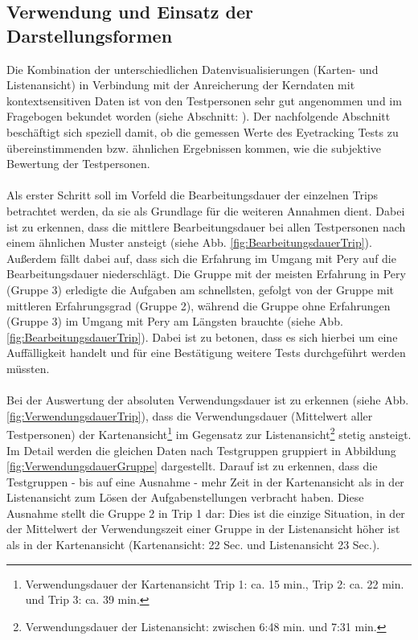 \documentclass[Bachelorarbeit.tex]{subfiles}
\begin{document}
\subsection{Verwendung und Einsatz der Darstellungsformen}
Die Kombination der unterschiedlichen Datenvisualisierungen (Karten- und Listenansicht) in Verbindung mit der Anreicherung der Kerndaten mit kontextsensitiven Daten ist von den Testpersonen sehr gut angenommen und im Fragebogen bekundet worden (siehe Abschnitt: ).
Der nachfolgende Abschnitt beschäftigt sich speziell damit, ob die gemessen Werte des Eyetracking Tests zu übereinstimmenden bzw. ähnlichen Ergebnissen kommen,  wie die subjektive Bewertung der Testpersonen.\\
\\
Als erster Schritt soll im Vorfeld die Bearbeitungsdauer der einzelnen Trips betrachtet werden, da sie als Grundlage für die weiteren Annahmen dient. 
Dabei ist zu erkennen, dass die mittlere Bearbeitungsdauer bei allen Testpersonen nach einem ähnlichen Muster ansteigt (siehe Abb. \ref{fig:BearbeitungsdauerTrip}).
Außerdem fällt dabei auf, dass sich die Erfahrung im Umgang mit Pery auf die Bearbeitungsdauer niederschlägt. 
Die Gruppe mit der meisten Erfahrung in Pery (Gruppe 3) erledigte die Aufgaben am schnellsten, gefolgt von der Gruppe mit mittleren Erfahrungsgrad (Gruppe 2), während die Gruppe ohne Erfahrungen (Gruppe 3) im Umgang mit Pery am Längsten brauchte (siehe Abb. \ref{fig:BearbeitungsdauerTrip}).
Dabei ist zu betonen, dass es sich hierbei um eine Auffälligkeit handelt und für eine Bestätigung weitere Tests durchgeführt werden müssten.\\
\\
Bei der Auswertung der absoluten Verwendungsdauer ist zu erkennen (siehe Abb. \ref{fig:VerwendungsdauerTrip}), dass die Verwendungsdauer (Mittelwert aller Testpersonen) der Kartenansicht\footnote{Verwendungsdauer der Kartenansicht Trip 1: ca. 15 min., Trip 2: ca. 22 min. und Trip 3: ca. 39 min.} im Gegensatz zur Listenansicht\footnote{Verwendungsdauer der Listenansicht: zwischen 6:48 min. und 7:31 min.} stetig ansteigt.  
Im Detail werden die gleichen Daten nach Testgruppen gruppiert in Abbildung \ref{fig:VerwendungsdauerGruppe} dargestellt. 
Darauf ist zu erkennen, dass die Testgruppen - bis auf eine Ausnahme - mehr Zeit in der Kartenansicht als in der Listenansicht zum Lösen der Aufgabenstellungen verbracht haben. 
Diese Ausnahme stellt die Gruppe 2 in Trip 1 dar: Dies ist die einzige Situation, in der der Mittelwert der Verwendungszeit einer Gruppe in der Listenansicht höher ist als in der Kartenansicht (Kartenansicht: 22 Sec. und Listenansicht 23 Sec.).
\end{document}
